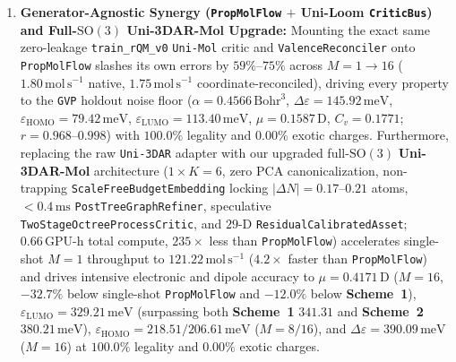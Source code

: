 \documentclass[11pt,a4paper]{article}
\begin{document}
\begin{enumerate}[leftmargin=1.5em,itemsep=2pt,topsep=2pt]
    \item \textbf{Generator-Agnostic Synergy (\texttt{PropMolFlow} $+$ \textbf{Uni-Loom} \texttt{CriticBus}) and Full-$\text{SO}(3)$ \textbf{Uni-3DAR-Mol} Upgrade:} Mounting the exact same zero-leakage \texttt{train\_rQM\_v0} \texttt{Uni-Mol} critic and \texttt{ValenceReconciler} onto \texttt{PropMolFlow} slashes its own errors by $59\%\text{--}75\%$ across $M=1 \to 16$ ($1.80\,\text{mol}\,\text{s}^{-1}$ native, $1.75\,\text{mol}\,\text{s}^{-1}$ coordinate-reconciled), driving every property to the \texttt{GVP} holdout noise floor ($\alpha=0.4566\,\text{Bohr}^3$, $\Delta\varepsilon=145.92\,\text{meV}$, $\varepsilon_{\text{HOMO}}=79.42\,\text{meV}$, $\varepsilon_{\text{LUMO}}=113.40\,\text{meV}$, $\mu=0.1587\,\text{D}$, $C_v=0.1771$; $r=0.968\text{--}0.998$) with $100.0\%$ legality and $0.00\%$ exotic charges. Furthermore, replacing the raw \texttt{Uni-3DAR} adapter with our upgraded full-$\text{SO}(3)$ \textbf{Uni-3DAR-Mol} architecture \citep{chen2026uni3darmol} ($1\times K=6$, zero PCA canonicalization, non-trapping \texttt{ScaleFreeBudgetEmbedding} locking $|\Delta N|=0.17\text{--}0.21$ atoms, $<0.4\,\text{ms}$ \texttt{PostTreeGraphRefiner}, speculative \texttt{TwoStageOctreeProcessCritic}, and $29$-D \texttt{ResidualCalibratedAsset}; $0.66\,\text{GPU-h}$ total compute, $235\times$ less than \texttt{PropMolFlow}) accelerates single-shot $M=1$ throughput to $121.22\,\text{mol}\,\text{s}^{-1}$ ($4.2\times$ faster than \texttt{PropMolFlow}) and drives intensive electronic and dipole accuracy to $\mu = 0.4171\,\text{D}$ ($M=16$, $-32.7\%$ below single-shot \texttt{PropMolFlow} and $-12.0\%$ below \textbf{Scheme~1}), $\varepsilon_{\text{LUMO}} = 329.21\,\text{meV}$ (surpassing both \textbf{Scheme~1} $341.31$ and \textbf{Scheme~2} $380.21\,\text{meV}$), $\varepsilon_{\text{HOMO}} = 218.51 / 206.61\,\text{meV}$ ($M=8/16$), and $\Delta\varepsilon = 390.09\,\text{meV}$ ($M=16$) at $100.0\%$ legality and $0.00\%$ exotic charges.
\end{enumerate}
\end{document}
